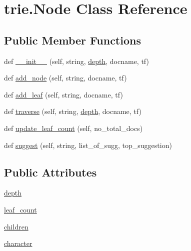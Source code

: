 \hypertarget{classtrie_1_1_node}{}\section{trie.\+Node Class Reference}
\label{classtrie_1_1_node}
\subsection*{Public Member Functions}
\begin{DoxyCompactItemize}
\item 
def \hyperlink{classtrie_1_1_node_aa69afd4739cf158324e3e8a93a5769d9}{\+\_\+\+\_\+init\+\_\+\+\_\+} (self, string, \hyperlink{classtrie_1_1_node_a1312b7e67b6012b37960e0f4d1a0190c}{depth}, docname, tf)
\item 
def \hyperlink{classtrie_1_1_node_a72026f7c23425c092ba4fd22b343e52d}{add\+\_\+node} (self, string, docname, tf)
\item 
def \hyperlink{classtrie_1_1_node_a450c43b9511ed6d30ddbf827979d16fd}{add\+\_\+leaf} (self, string, docname, tf)
\item 
def \hyperlink{classtrie_1_1_node_a466d5b2bdd9e8fbbd5b69038259b388b}{traverse} (self, string, \hyperlink{classtrie_1_1_node_a1312b7e67b6012b37960e0f4d1a0190c}{depth}, docname, tf)
\item 
def \hyperlink{classtrie_1_1_node_af6fdb2754e8a7af36cd5ede2426a6444}{update\+\_\+leaf\+\_\+count} (self, no\+\_\+total\+\_\+docs)
\item 
def \hyperlink{classtrie_1_1_node_af2ad8ae56effb8da0d5301f85717e599}{suggest} (self, string, list\+\_\+of\+\_\+sugg, top\+\_\+suggestion)
\end{DoxyCompactItemize}
\subsection*{Public Attributes}
\begin{DoxyCompactItemize}
\item 
\hyperlink{classtrie_1_1_node_a1312b7e67b6012b37960e0f4d1a0190c}{depth}
\item 
\hyperlink{classtrie_1_1_node_a697c4a8b684efa32dd2128e0ba92098a}{leaf\+\_\+count}
\item 
\hyperlink{classtrie_1_1_node_ac307391049d0d89c012935be130933fc}{children}
\item 
\hyperlink{classtrie_1_1_node_a68e789b347f2aef75414c8b91f353ec4}{character}
\end{DoxyCompactItemize}


